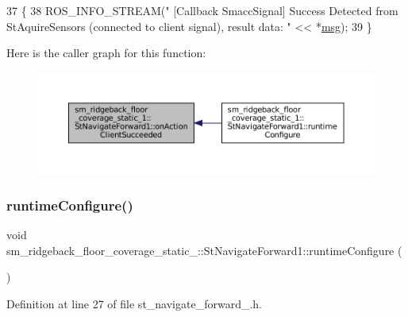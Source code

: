 \begin{DoxyCode}
37     \{
38       ROS\_INFO\_STREAM(\textcolor{stringliteral}{" [Callback SmaccSignal] Success Detected from StAquireSensors (connected to client
       signal), result data: "} << *\hyperlink{namespacebattery__monitor__node_ab1920c64448816edd4064e494275fdff}{msg});
39     \}
\end{DoxyCode}
Here is the caller graph for this function\+:
\nopagebreak
\begin{figure}[H]
\begin{center}
\leavevmode
\includegraphics[width=350pt]{structsm__ridgeback__floor__coverage__static__1_1_1StNavigateForward1_ac459cf53276a9d78e6c40627c47a5e67_icgraph}
\end{center}
\end{figure}
\mbox{\label{structsm__ridgeback__floor__coverage__static__1_1_1StNavigateForward1_a5c06e290228ff7469666822fa041d767}} 
\subsubsection{\texorpdfstring{runtime\+Configure()}{runtimeConfigure()}}
{\footnotesize\ttfamily void sm\+\_\+ridgeback\+\_\+floor\+\_\+coverage\+\_\+static\+\_\+::\+St\+Navigate\+Forward1\+::runtime\+Configure (\begin{DoxyParamCaption}{ }\end{DoxyParamCaption})\hspace{0.3cm}{\ttfamily [inline]}}



Definition at line 27 of file st\+\_\+navigate\+\_\+forward\+\_.\+h.



